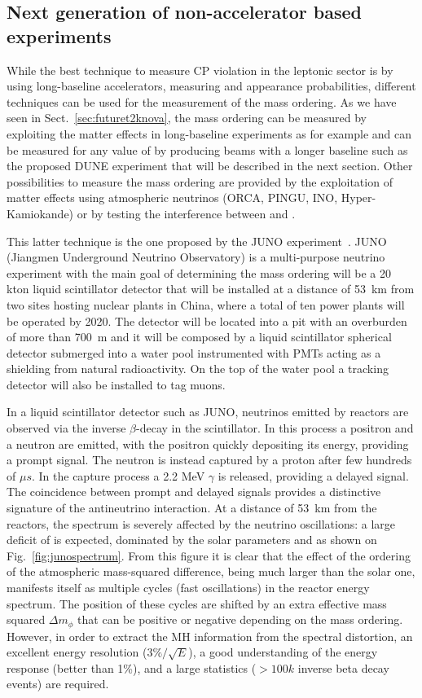\subsection{Next generation of non-accelerator based experiments}
While the best technique to measure CP violation in the leptonic sector is by using long-baseline accelerators, measuring \nue and \nueb appearance probabilities, different techniques can be used for the measurement of the mass ordering.
As we have seen in Sect.~\ref{sec:futuret2knova}, the mass ordering can be measured by exploiting the matter effects in long-baseline experiments as for example \nova and can be measured for any value of \dcp by producing beams with a longer baseline such as the proposed DUNE experiment that will be described in the next section. Other possibilities to measure the mass ordering are provided by the exploitation of matter effects using atmospheric neutrinos (ORCA, PINGU, INO, Hyper-Kamiokande) or by testing the interference between \dmsq and \dmsqtwo.

This latter technique is the one proposed by the JUNO experiment~\cite{}. JUNO (Jiangmen Underground Neutrino Observatory) is a multi-purpose neutrino experiment with the main goal of determining the mass ordering will be a 20 kton liquid scintillator detector that will be installed at a distance of 53~km from two sites hosting nuclear plants in China, where a total of ten power plants will be operated by 2020. The detector will be located into a pit with an overburden of more than 700~m and it will be composed by a liquid scintillator spherical detector submerged into a water pool instrumented with PMTs acting as a shielding from natural radioactivity. On the top of the water pool a tracking detector will also be installed to tag muons. 

In a liquid scintillator detector such as JUNO, neutrinos emitted by reactors are observed via the inverse $\beta$-decay in the scintillator. In this process a positron and a neutron are emitted, with the positron quickly depositing its energy, providing a prompt signal. The neutron is instead captured by a proton after few hundreds of $\mu s$. In the capture process a 2.2 MeV $\gamma$ is released, providing a delayed signal. The coincidence between prompt and delayed signals provides a distinctive signature of the antineutrino interaction.
At a distance of 53~km from the reactors, the spectrum is severely affected by the neutrino oscillations: a large deficit of \nueb is expected, dominated by the solar parameters \thsol and \dmsqso as shown on Fig.~\ref{fig:junospectrum}. From this figure it is clear that the effect of the ordering of the atmospheric mass-squared difference, being much larger than the solar one, manifests itself as multiple cycles (fast oscillations) in the reactor energy spectrum. The position of these cycles are shifted by an extra effective mass squared $\Delta m_{\phi}$ that can be positive or negative depending on the mass ordering. However, in order to extract the MH information from the spectral distortion, an excellent energy resolution ($3\%/ \sqrt{E}$), a good understanding of the energy response (better than 1\%), and a large statistics ($>100k$ inverse beta decay events) are required.
 
